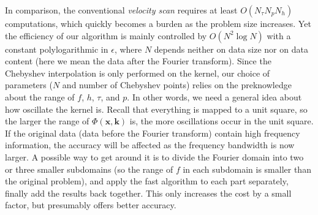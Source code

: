 In comparison, the conventional {\it velocity scan} requires at least $O(N_{\tau}N_pN_h)$ computations, which quickly becomes a burden as the problem size increases. Yet the efficiency of our algorithm is mainly controlled by $O(N^2 \log N)$ with a constant polylogarithmic in $\epsilon$, where $N$ depends neither on data size nor on data content (here we mean the data after the Fourier transform). Since the Chebyshev interpolation is only performed on the kernel, our choice of parameters ($N$ and number of Chebyshev points) relies on the preknowledge about the range of $f$, $h$, $\tau$, and $p$. In other words, we need a general idea about how oscillate the kernel is. Recall that everything is mapped to a unit square, so the larger the range of $\Phi(\mathbf{x},\mathbf{k})$ is, the more oscillations occur in the unit square. If the original data (data before the Fourier transform) contain high frequency information, the accuracy will be affected as the frequency bandwidth is now larger. A possible way to get around it is to divide the Fourier domain into two or three smaller subdomains (so the range of $f$ in each subdomain is smaller than the original problem), and apply the fast algorithm to each part separately, finally add the results back together. This only increases the cost by a small factor, but presumably offers better accuracy.



